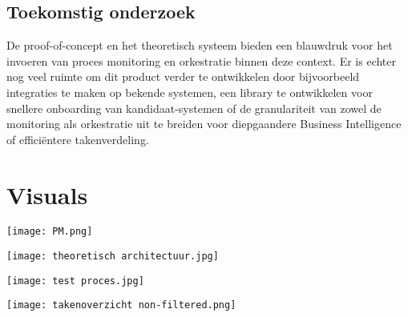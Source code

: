 \documentclass[a0,portrait]{hogent-poster}
\begin{document}
\begin{multicols}{2}
\section{Toekomstig onderzoek}
De proof-of-concept en het theoretisch systeem bieden een blauwdruk voor het invoeren van proces monitoring en orkestratie binnen deze context. Er is echter nog veel ruimte om dit product verder te ontwikkelen door bijvoorbeeld integraties te maken op bekende systemen, een library te ontwikkelen voor snellere onboarding van kandidaat-systemen of de granulariteit van zowel de monitoring als orkestratie uit te breiden voor diepgaandere Business Intelligence of efficiëntere takenverdeling.
\end{multicols}

\section{Visuals}
\begin{multicols}{2} 
\begin{center}
  \captionsetup{type=figure}
  \texttt{[image: PM.png]}
  \vspace{0.5cm}
\end{center}

\begin{center}
  \captionsetup{type=figure}
  \texttt{[image: theoretisch architectuur.jpg]}
  \vspace{0.5cm}
\end{center}

\begin{center}
  \captionsetup{type=figure}
  \texttt{[image: test proces.jpg]}
  \vspace{0.5cm}
\end{center}

\begin{center}
  \captionsetup{type=figure}
  \texttt{[image: takenoverzicht non-filtered.png]}
  \vspace{0.5cm}
\end{center}
\end{multicols}
\end{document}

